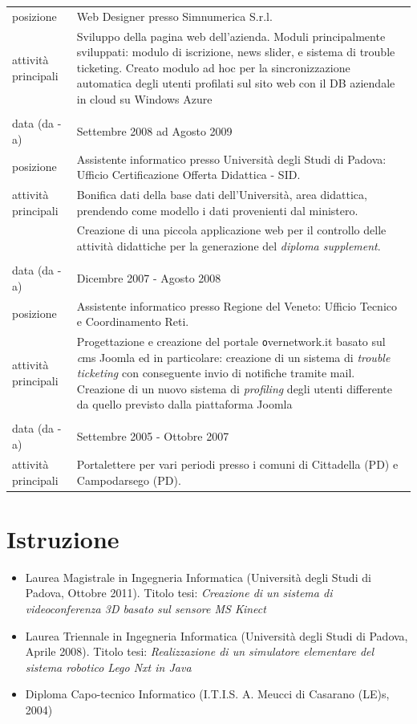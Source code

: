 \documentclass[pdftex,a4paper,10pt,twoside,titlepage,italian]{article}
\begin{document}
\begin{longtable}[h]{l p{}}
\footnotesize{posizione} & Web Designer presso Simnumerica S.r.l.\\
\footnotesize{attività principali}& Sviluppo della pagina web dell'azienda. Moduli principalmente sviluppati: modulo di 
		iscrizione, news slider, e sistema di trouble ticketing. Creato modulo ad hoc per la sincronizzazione automatica degli
		utenti profilati sul sito web con il DB aziendale in cloud su Windows Azure\\
		& \\
\footnotesize{data (da - a)} & Settembre 2008 ad Agosto 2009 \\
\footnotesize{posizione} & Assistente informatico presso Università degli Studi di Padova: 
					Ufficio Certificazione Offerta Didattica - SID.\\
\footnotesize{attività principali} & Bonifica dati della base dati dell'Università, area didattica, prendendo come 
		modello i dati provenienti dal ministero.\\
		& Creazione di una piccola applicazione web per il controllo delle attività didattiche
		per la generazione del \textit{diploma supplement}.\\
& \\
\footnotesize{data (da - a)} & Dicembre 2007 - Agosto 2008 \\
\footnotesize{posizione} & Assistente informatico presso Regione del Veneto: Ufficio Tecnico e Coordinamento Reti.\\
\footnotesize{attività principali} & Progettazione e creazione del portale {\texttt overnetwork.it} basato sul {\textit cms Joomla}
		ed in particolare: creazione di un sistema di \textit{trouble ticketing} con conseguente 
		invio di notifiche tramite mail. Creazione di un nuovo sistema di \textit{profiling}
		degli utenti differente da quello previsto dalla piattaforma Joomla\\
& \\
\footnotesize{data (da - a)} & Settembre 2005 - Ottobre 2007 \\
\footnotesize{attività principali} & Portalettere per vari periodi presso i comuni di Cittadella (PD) e Campodarsego (PD).\\
\end{longtable}

\section*{Istruzione}
\begin{itemize}
	\item Laurea Magistrale in Ingegneria Informatica (Università degli Studi di Padova, Ottobre 2011).
	Titolo tesi: {\itshape Creazione di un sistema di videoconferenza 3D basato sul sensore MS Kinect}
	\item Laurea Triennale in Ingegneria Informatica (Università degli Studi di Padova, Aprile 2008). 
	Titolo tesi: {\itshape Realizzazione di un simulatore elementare del sistema robotico Lego Nxt
	in Java}
	\item Diploma Capo-tecnico Informatico (I.T.I.S. A. Meucci di Casarano (LE)s, 2004)
\end{itemize}
\end{document}

